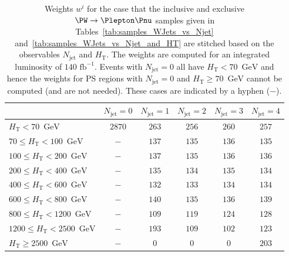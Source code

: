 \documentclass[twocolumn,epjc3]{svjour3}
\newcommand{\HT}{\ensuremath{H_{\mathrm{T}}}\xspace}
\newcommand{\GeV}{\ensuremath{\textrm{GeV}}\xspace}
\newcommand{\jet}{\ensuremath{\textrm{jet}}\xspace}
\newcommand{\fbinv}{\ensuremath{\textrm{~fb}^{-1}}\xspace}
\begin{document}
\begin{table}
\caption{
  Weights $w^{i}$ for the case that the inclusive and exclusive $\PW \to \Plepton\Pnu$ samples 
  given in 
  Tables~\ref{tab:samples_WJets_vs_Njet} and~\ref{tab:samples_WJets_vs_Njet_and_HT}
  are stitched based on the observables $N_{\jet}$ and $\HT$.
  The weights are computed for an integrated luminosity of $140\fbinv$.
  Events with $N_{\jet} = 0$ all have $\HT < 70$~\GeV and hence the weights for PS regions with $N_{\jet} = 0$ and $\HT \geqslant 70$~\GeV cannot be computed (and are not needed).
  These cases are indicated by a hyphen ($-$).
}
\label{tab:weights_WJets_vs_Njet_and_HT}
\begin{center}
\begin{tabular}{l|c|c|c|c|c}
\hline
                                 & $N_{\jet} = 0$ & $N_{\jet} = 1$      & $N_{\jet} = 2$      & $N_{\jet} = 3$      & $N_{\jet} = 4$       \\ 
\hline
               $\HT < 70$~\GeV   & $2870$         &  $263$              & $256$              & $260$              &  $257$  \\
  $70 \leqslant \HT < 100$~\GeV  & $-$            &  $137$              & $135$              & $136$              &  $135$  \\
 $100 \leqslant \HT < 200$~\GeV  & $-$            &  $137$              & $135$              & $136$              &  $136$  \\
 $200 \leqslant \HT < 400$~\GeV  & $-$            &  $135$              & $134$              & $135$              &  $134$  \\
 $400 \leqslant \HT < 600$~\GeV  & $-$            &  $132$              & $133$              & $134$              &  $134$  \\
 $600 \leqslant \HT < 800$~\GeV  & $-$            &  $140$              & $135$              & $136$              &  $139$  \\
 $800 \leqslant \HT < 1200$~\GeV & $-$            &  $109$              & $119$              & $124$              &  $128$  \\
$1200 \leqslant \HT < 2500$~\GeV & $-$            &  $193$              & $109$              & $102$              &  $123$  \\
       $\HT \geqslant 2500$~\GeV & $-$            &    $0$              &   $0$              &   $0$              &  $203$  \\
\hline
\end{tabular}
\end{center}
\end{table}
\end{document}
